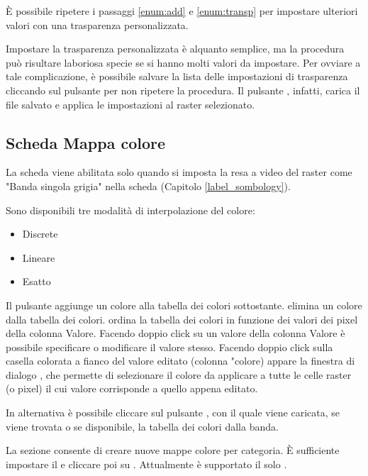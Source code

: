 È possibile ripetere i passaggi \ref{enum:add} e \ref{enum:transp} per
impostare ulteriori valori con una trasparenza personalizzata.

Impostare la trasparenza personalizzata è alquanto semplice, ma la 
procedura può risultare laboriosa specie se si hanno molti valori da
impostare. Per ovviare a tale complicazione, è possibile salvare la 
lista delle impostazioni di trasparenza cliccando sul pulsante  per non ripetere la procedura. 
Il pulsante , infatti, 
carica il file salvato e applica le impostazioni al raster selezionato.

\subsection{Scheda Mappa colore} \label{label_colormaptab}

La scheda  viene abilitata solo quando si imposta la resa
a video del raster come "Banda singola grigia" nella scheda  
(Capitolo \ref{label_sombology}).

Sono disponibili tre modalità di interpolazione del colore:
\begin{itemize}
\item Discrete
\item Lineare
\item Esatto
\end{itemize}

Il pulsante  aggiunge un colore alla tabella dei colori sottostante.
 elimina un colore dalla tabella dei colori.
 ordina la tabella dei colori in funzione dei valori dei pixel della colonna Valore.  
Facendo doppio click su un valore della colonna Valore è possibile specificare o modificare il valore stesso.
Facendo doppio click sulla casella colorata a fianco del valore editato (colonna "colore) appare
la finestra di dialogo , che permette di selezionare il colore da applicare 
a tutte le celle raster (o pixel) il cui valore corrisponde a quello appena editato.

In alternativa è possibile cliccare sul pulsante
, con il
quale viene caricata, se viene trovata o se disponibile, la tabella dei colori dalla banda.

La sezione  consente di creare nuove
mappe colore per categoria. È sufficiente impostare il  e cliccare poi su
. Attualmente è supportato il solo .

